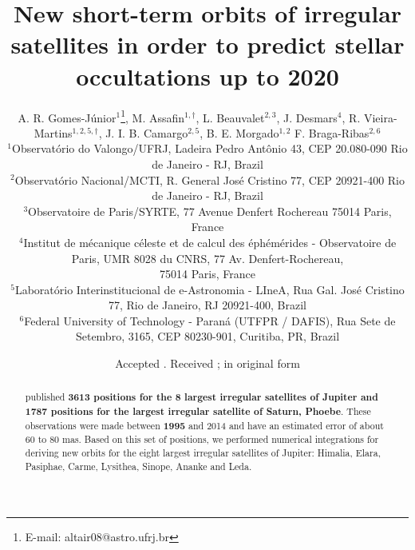\documentclass[useAMS,usenatbib]{mn2e}
\title[Orbits and predictions for occultations up to 2020]{New short-term orbits of irregular satellites in order to predict stellar occultations up to 2020}
\author[A. R. Gomes-J\'unior, M. Assafin, L. Beauvalet et al.]{A. R. Gomes-J\'unior$^{1}$\thanks{E-mail: altair08@astro.ufrj.br},
M. Assafin$^{1,\dag}$,
L. Beauvalet$^{2,3}$,
J. Desmars$^{4}$,\newauthor
R. Vieira-Martins$^{1,2,5,\dag}$,
J. I. B. Camargo$^{2,5}$,
B. E. Morgado$^{1,2}$
F. Braga-Ribas$^{2,6}$
\\
$^{1}$Observat\'orio do Valongo/UFRJ, Ladeira Pedro Ant\^onio 43,
CEP 20.080-090 Rio de Janeiro - RJ, Brazil\\
$^{2}$Observat\'orio Nacional/MCTI, R. General Jos\'e Cristino 77, CEP 20921-400 Rio de Janeiro - RJ, Brazil\\
$^{3}$Observatoire de Paris/SYRTE, 77 Avenue Denfert Rochereau 75014 Paris, France\\
$^{4}$Institut de m\'ecanique c\'eleste et de calcul des \'eph\'em\'erides - Observatoire de Paris, UMR 8028 du CNRS, 77 Av. Denfert-Rochereau,\\ 75014 Paris, France\\
$^{5}$Laborat\'orio Interinstitucional de e-Astronomia - LIneA, Rua Gal. Jos\'e Cristino 77, Rio de Janeiro, RJ 20921-400, Brazil\\
$^{6}$Federal University of Technology - Paran\'a (UTFPR / DAFIS), Rua Sete de Setembro, 3165, CEP 80230-901, Curitiba, PR, Brazil
}
\begin{document}
\newcommand{\noccs}{5442 } %

\date{Accepted . Received ; in original form }

\pagerange{\pageref{firstpage}--\pageref{lastpage}} 

\maketitle

\label{firstpage}

\begin{abstract}
\cite{GomesJunior2015} published \textbf{3613 positions for the 8 largest irregular satellites of Jupiter and 1787 positions for the largest irregular satellite of Saturn, Phoebe}.  These observations were made between \textbf{1995} and 2014 and have an estimated error of about 60 to 80 mas. Based on this set of positions, we performed numerical integrations for deriving new orbits for the eight largest irregular satellites of Jupiter: Himalia, Elara, Pasiphae, Carme, Lysithea, Sinope, Ananke and Leda. %

\end{abstract}
\end{document}
